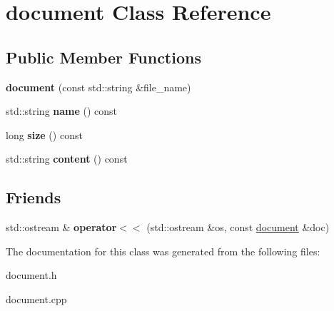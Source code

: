 \hypertarget{classdocument}{}\section{document Class Reference}
\label{classdocument}
\subsection*{Public Member Functions}
\begin{DoxyCompactItemize}
\item 
\mbox{\label{classdocument_a750ac91b3537c59d0fff8e4a01085c98}} 
{\bfseries document} (const std\+::string \&file\+\_\+name)
\item 
\mbox{\label{classdocument_adb574ffbe92dcb3b2ba2eb134257a091}} 
std\+::string {\bfseries name} () const
\item 
\mbox{\label{classdocument_aee0dba5f11baeb3b7da786bdd320a576}} 
long {\bfseries size} () const
\item 
\mbox{\label{classdocument_a1f8943b94ad98c7b7c4b6fbec6370f66}} 
std\+::string {\bfseries content} () const
\end{DoxyCompactItemize}
\subsection*{Friends}
\begin{DoxyCompactItemize}
\item 
\mbox{\label{classdocument_af474a7f5ba29bca5df031898e86a8687}} 
std\+::ostream \& {\bfseries operator$<$$<$} (std\+::ostream \&os, const \hyperlink{classdocument}{document} \&doc)
\end{DoxyCompactItemize}


The documentation for this class was generated from the following files\+:\begin{DoxyCompactItemize}
\item 
document.\+h\item 
document.\+cpp\end{DoxyCompactItemize}
